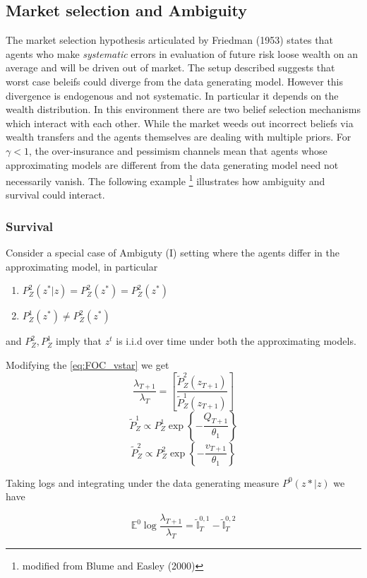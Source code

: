 \documentclass[12pt]{article}
\begin{document}
\subsection{Market selection and Ambiguity}
The market selection hypothesis articulated by Friedman (1953) states that agents who make \emph{systematic} errors in evaluation of future risk loose wealth on an average and will be driven out of market. The setup described suggests that worst case beleifs could diverge from the data generating model. However this divergence is endogenous and not systematic. In particular it depends on the wealth distribution. In this environment there are two belief selection mechanisms which interact with each other. While the market weeds out incorrect beliefs via wealth transfers and the agents themselves are dealing with multiple priors. For $\gamma < 1$, the over-insurance and pessimism channels mean that agents whose approximating models are different from the data generating model need not necessarily vanish. The following example \footnote{modified from Blume and Easley (2000) } illustrates how ambiguity and survival could interact.

\subsubsection{Survival}
Consider a special case of Ambiguty (I) setting  where the agents differ in the approximating model, in particular
\begin{enumerate}
\item $P^2_Z(z^*|z)=P^2_Z(z^*)=P^2_Z(z^*)$
\item $P_Z^1(z^*) \neq P^2_Z(z^*)$
\end{enumerate}
and $P^2_Z,P^1_Z$ imply that $z^t$ is i.i.d over time under both the approximating models. 

Modifying the \ref{eq:FOC_vstar} we get 
%
\[\frac{\lambda_{T+1}}{\lambda_{T}} =\left[\frac{\tilde{P}^2_Z(z_{T+1})}{\tilde{P}^1_{Z}(z_{T+1})}\right]\]
\[\tilde{P}^1_Z \propto P^1_Z \exp \left\{-\frac{Q_{T+1}}{\theta_1}\right\}\]
\[\tilde{P}^2_Z \propto P^2_Z \exp \left\{-\frac{v_{T+1}}{\theta_1}\right\}\]

Taking logs and integrating under the data generating measure $P^0(z*|z)$  we have


\begin{equation}
\mathbb{E}^0 \log\frac{\lambda_{T+1}}{\lambda_{T}} = \tilde{\mathbb{I}}^{0,1}_{T}-\tilde{\mathbb{I}}^{0,2}_{T}
\end{equation}
\end{document}
